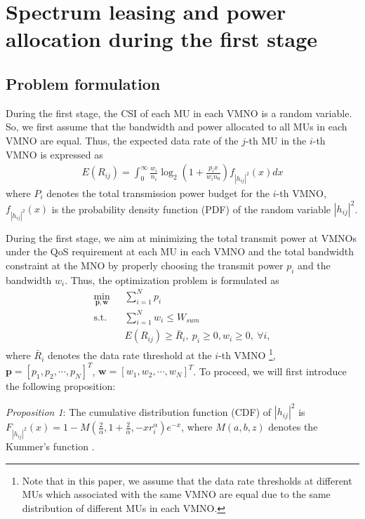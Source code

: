 \documentclass[journal]{IEEEtran}
\begin{document}
\section{Spectrum leasing and power allocation during the first stage}

\subsection{Problem formulation}
During the first stage, the CSI of each MU in each VMNO is a random variable. So, we first assume that the bandwidth and power allocated to all MUs in each VMNO are equal. Thus, the expected data rate of the $j$-th MU in the $i$-th VMNO is expressed as
\begin{align}
E\left({R}_{ij}\right) = \int_{0}^{\infty} \frac{w_i}{n_i} \log_2\left(1 + \frac{p_i x}{w_i n_0}\right) f_{\left|h_{ij} \right|^2} \left(x\right)dx
\end{align}
where $P_i$ denotes the total transmission power budget for the $i$-th VMNO, $f_{\left|h_{ij} \right|^2} \left(x\right)$ is the probability density function (PDF) of the random variable $\left|h_{ij} \right|^2$. 

During the first stage, we aim at minimizing the total transmit power at VMNOs under the QoS requirement at each MU in each VMNO and the total bandwidth constraint at the MNO by properly choosing the transmit power $p_i$ and the bandwidth $w_i$. Thus, the optimization problem is formulated as
\begin{subequations}\label{q4}
	\begin{align}
	\min_{\mathbf{p}, \mathbf{w}}\ & \sum\limits_{i = 1}^{N} p_i \\ \mbox{s.t.} \quad &  \sum\limits_{i = 1}^{N} w_i \leq W_{sum}\\ \quad &  E\left({R}_{ij}\right) \geq \bar{R}_i, \ p_i \geq 0, w_i \geq 0, \ \forall i, 
	\end{align}
\end{subequations}
where $\bar{R}_i$ denotes the data rate threshold at the $i$-th VMNO  \footnote{Note that in this paper, we assume that the data rate thresholds at different MUs which associated with the same VMNO are equal due to the same distribution of different MUs in each VMNO.}, $\mathbf{p} = \left[p_1, p_2, \cdots, p_N\right]^T$, $\mathbf{w} = \left[w_1, w_2, \cdots, w_N\right]^T$. To proceed, we will first introduce the following proposition:

\textit{Proposition 1}: The cumulative distribution function (CDF) of $\left|h_{ij} \right|^2$ is $F_{\left|h_{ij} \right|^2}\left(x\right) = 1 - M\left(\frac{2}{\alpha}, 1 + \frac{2}{\alpha}, - x r_i^{\alpha}\right)e^{-x}$, where $M\left(a,b,z\right)$ denotes the Kummer's function \cite{MAbramowitz}.
\end{document}
